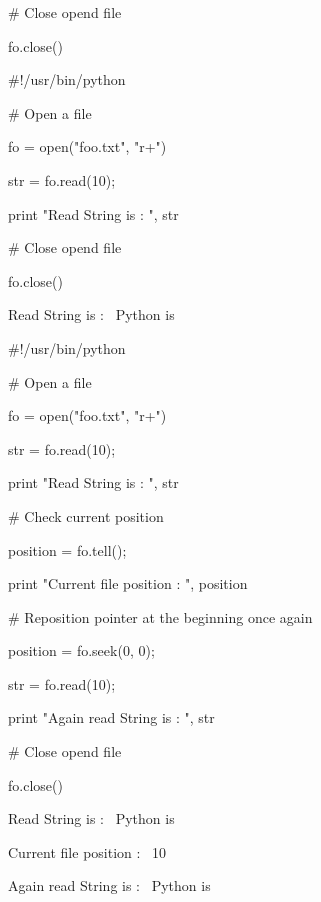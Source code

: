 \noindent 
 $  \#  $ Close opend file \par
\noindent 
fo.close() \par
\noindent 
 $  \#  $!/usr/bin/python \par
\vspace{12pt}
\noindent 
 $  \#  $ Open a file \par
\noindent 
fo = open("foo.txt", "r+") \par
\noindent 
str = fo.read(10); \par
\noindent 
print "Read String is : ", str \par
\vspace{12pt}
\noindent 
 $  \#  $ Close opend file \par
\noindent 
fo.close() \par
\vspace{12pt}
\noindent 
Read String is :~ Python is \par
\vspace{16pt}
\noindent 
 $  \#  $!/usr/bin/python \par
\vspace{12pt}
\noindent 
 $  \#  $ Open a file \par
\noindent 
fo = open("foo.txt", "r+") \par
\noindent 
str = fo.read(10); \par
\noindent 
print "Read String is : ", str \par
\vspace{12pt}
\noindent 
 $  \#  $ Check current position \par
\noindent 
position = fo.tell(); \par
\noindent 
print "Current file position : ", position \par
\vspace{12pt}
\noindent 
 $  \#  $ Reposition pointer at the beginning once again \par
\noindent 
position = fo.seek(0, 0); \par
\noindent 
str = fo.read(10); \par
\noindent 
print "Again read String is : ", str \par
\noindent 
 $  \#  $ Close opend file \par
\noindent 
fo.close() \par
\vspace{14pt}
\noindent 
Read String is :~ Python is \par
\noindent 
Current file position :~ 10 \par
\noindent 
Again read String is :~ Python is \par
